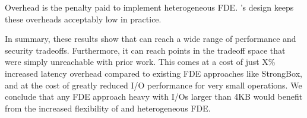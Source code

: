 Overhead is the penalty paid to implement heterogeneous FDE. \sys's design keeps
these overheads acceptably low in practice.

In summary, these results show that \sys can reach a wide range of performance
and security tradeoffs. Furthermore, it can reach points in the tradeoff space
that were simply unreachable with prior work. This comes at a cost of just X\%
increased latency overhead compared to existing FDE approaches like StrongBox,
and at the cost of greatly reduced I/O performance for very small operations. We
conclude that any FDE approach heavy with I/Os larger than 4KB would benefit
from the increased flexibility of \sys and heterogeneous FDE.
